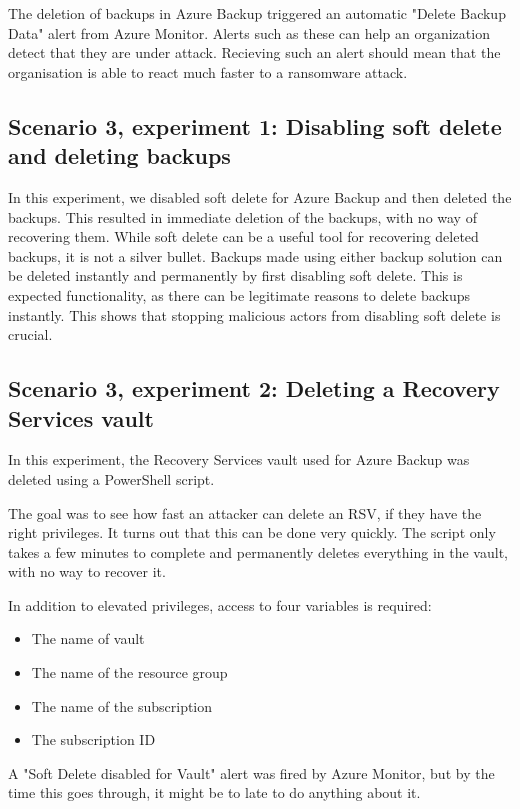 The deletion of backups in Azure Backup triggered an automatic "Delete Backup Data" alert from Azure Monitor. Alerts such as these can help an organization detect that they are under attack. Recieving such an alert should mean that the organisation is able to react much faster to a ransomware attack. 

\subsection{Scenario 3, experiment 1: Disabling soft delete and deleting backups}

In this experiment, we disabled soft delete for Azure Backup and then deleted the backups. This resulted in immediate deletion of the backups, with no way of recovering them. While soft delete can be a useful tool for recovering deleted backups, it is not a silver bullet. Backups made using either backup solution can be deleted instantly and permanently by first disabling soft delete. This is expected functionality, as there can be legitimate reasons to delete backups instantly. This shows that stopping malicious actors from disabling soft delete is crucial.

\subsection{Scenario 3, experiment 2: Deleting a Recovery Services vault}

In this experiment, the Recovery Services vault used for Azure Backup was deleted using a PowerShell script.

The goal was to see how fast an attacker can delete an RSV, if they have the right privileges.
It turns out that this can be done very quickly. The script only takes a few minutes to complete and permanently deletes everything in the vault, with no way to recover it.

In addition to elevated privileges, access to four variables is required:
\begin{itemize}
    \item The name of vault
    \item The name of the resource group
    \item The name of the subscription
    \item The subscription ID
\end{itemize}

A "Soft Delete disabled for Vault" alert was fired by Azure Monitor, but by the time this goes through, it might be to late to do anything about it.

